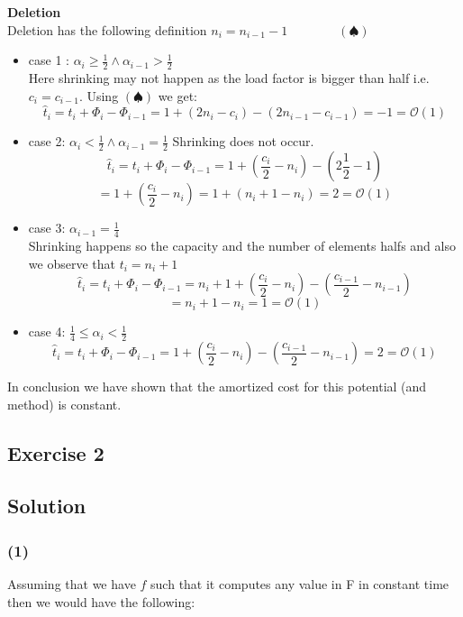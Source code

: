\documentclass[10pt,a4paper]{article}
\begin{document}
\textbf{Deletion}\\
Deletion has the following definition $n_i = n_{i-1} - 1 \quad \quad \quad \quad (\spadesuit)$
\begin{itemize}
\item case 1 : $\alpha_i \geq \frac{1}{2} \land \alpha_{i-1} > \frac{1}{2}$
\\Here shrinking may not happen as the load factor is bigger than half i.e. $c_i = c_{i-1}$. Using $(\spadesuit)$ we get:
$$
\hat{t}_i = t_i + \Phi_i -\Phi_{i-1}
= 1 + (2n_{i} - c_{i}) - (2n_{i-1} - c_{i-1}) = -1 = \mathcal{O}(1)
$$
\item case 2: $\alpha_i < \frac{1}{2} \land \alpha_{i-1} = \frac{1}{2}$
Shrinking does not occur. 
$$
\hat{t}_i = t_i + \Phi_i -\Phi_{i-1}
= 1 + (\frac{c_i}{2} - n_i) - (2\frac{1}{2} -1)  
$$
$$
= 1 + (\frac{c_i}{2} - n_i) = 1 + (n_i+1 - n_i) = 2 =\mathcal{O}(1)
$$
\item case 3: $\alpha_{i-1} = \frac{1}{4}$
\\Shrinking happens so the capacity and the number of elements halfs and also we observe that $t_i = n_i +1$
$$ 
\hat{t}_i = t_i + \Phi_i -\Phi_{i-1} = 
n_i +1 + (\frac{c_i}{2} - n_i) - (\frac{c_{i-1}}{2}-n_{i-1})
$$
$$
= n_i + 1 - n_i = 1 = \mathcal{O}(1)
$$
\item case 4: $\frac{1}{4} \leq \alpha_i < \frac{1}{2}$
$$ 
\hat{t}_i = t_i + \Phi_i -\Phi_{i-1} = 
1 + (\frac{c_i}{2} - n_i) - (\frac{c_{i-1}}{2}-n_{i-1})= 2 = \mathcal{O}(1)
$$
\end{itemize}
In conclusion we have shown that the amortized cost for this potential (and method) is constant.


\subsection*{Exercise 2}
\subsection*{Solution}

\subsubsection*{(1)} Assuming that we have $f$ such that it computes any value in F in constant time then we would have the following:
\end{document}
